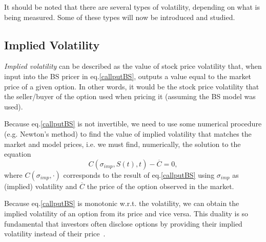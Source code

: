 It should be noted that there are several types of volatility, depending on what is being measured. Some of these types will now be introduced and studied.

\subsection{Implied Volatility}
\label{section:impliedvolatility}
\emph{Implied volatility} can be described as the value of stock price volatility that, when input into the BS pricer in eq.\eqref{callputBS}, outputs a value equal to the market price of a given option.
In other words, it would be the stock price volatility that the seller/buyer of the option used when pricing it (assuming the BS model was used).

Because eq.\eqref{callputBS} is not invertible, we need to use some numerical procedure (e.g. Newton's method) to find the value of implied volatility that matches the market and model prices, i.e. we must find, numerically, the solution to the equation
\begin{equation}\label{impvolform}
C(\sigma_{imp},S(t),t)-\overline{C}=0,
\end{equation}
\noindent where $C(\sigma_{imp},\cdot)$ corresponds to the result of eq.\eqref{callputBS} using $\sigma_{imp}$ as (implied) volatility and $\overline{C}$ the price of the option observed in the market.

Because eq.\eqref{callputBS} is monotonic w.r.t. the volatility, we can obtain the implied volatility of an option from its price and vice versa. This duality is so fundamental that investors often disclose options by providing their implied volatility instead of their price~\cite{Wilmott}.

